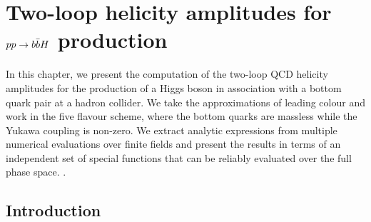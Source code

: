 \documentclass[main.tex]{subfiles}
\begin{document}
\chapter{Two-loop helicity amplitudes for $pp \rightarrow b\bar{b}H$ production} \label{sec:Hbb}
In this chapter, we present the computation of the two-loop QCD helicity amplitudes for the production of a Higgs boson in association with a bottom quark pair at a hadron collider. We take the approximations of leading colour and work in the five flavour scheme, where the bottom quarks are massless while the Yukawa coupling is non-zero. We extract analytic expressions from multiple numerical evaluations over finite fields and present the results in terms of an independent set of special functions that can be reliably evaluated over the full phase space.
.
\\
\section{Introduction \label{Hbbsec:intro}}
\end{document}
